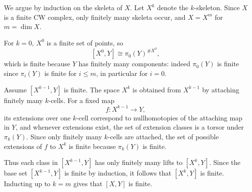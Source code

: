 \documentclass[12pt]{article}
\begin{document}
\begin{solution}
We argue by induction on the skeleta of $X$. Let $X^k$ denote the $k$-skeleton.
Since $X$ is a finite CW complex, only finitely many skeleta occur, and $X=X^m$ for $m=\dim X$.

For $k=0$, $X^0$ is a finite set of points, so
\[
[X^0,Y]\cong \pi_0(Y)^{\# X^0},
\]
which is finite because $Y$ has finitely many components: indeed $\pi_0(Y)$ is finite since $\pi_i(Y)$ is finite for $i\le m$, in particular for $i=0$.

Assume $[X^{k-1},Y]$ is finite. The space $X^k$ is obtained from $X^{k-1}$ by attaching finitely many $k$-cells. For a fixed map
\[
f\colon X^{k-1}\to Y,
\]
its extensions over one $k$-cell correspond to nullhomotopies of the attaching map in $Y$, and whenever extensions exist, the set of extension classes is a torsor under $\pi_k(Y)$. Since only finitely many $k$-cells are attached, the set of possible extensions of $f$ to $X^k$ is finite because $\pi_k(Y)$ is finite.

Thus each class in $[X^{k-1},Y]$ has only finitely many lifts to $[X^k,Y]$. Since the base set $[X^{k-1},Y]$ is finite by induction, it follows that $[X^k,Y]$ is finite. Inducting up to $k=m$ gives that $[X,Y]$ is finite.
\end{solution}
\end{document}
